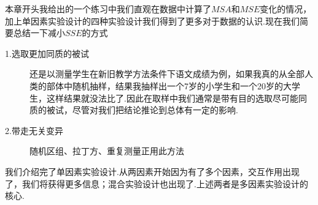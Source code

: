本章开头我给出的一个练习中我们直观在数据中计算了$MSA$和$MSE$变化的情况，加上单因素实验设计的四种实验设计我们得到了更多对于数据的认识.现在我们简要总结一下减小$SSE$的方式

\begin{description}
\item[1.选取更加同质的被试] 还是以测量学生在新旧教学方法条件下语文成绩为例，如果我真的从全部人类的部体中随机抽样，结果我抽样出一个7岁的小学生和一个20岁的大学生，这样结果就没法比了.因此在取样中我们通常是带有目的选取尽可能同质的被试，尽管对我们把结论推论到总体有一定的影响.
\item [2.带走无关变异] 随机区组、拉丁方、重复测量正用此方法
\end{description}

我们介绍完了单因素实验设计.从两因素开始因为有了多个因素，交互作用出现了，我们将获得更多信息；混合实验设计也出现了.上述两者是多因素实验设计的核心.